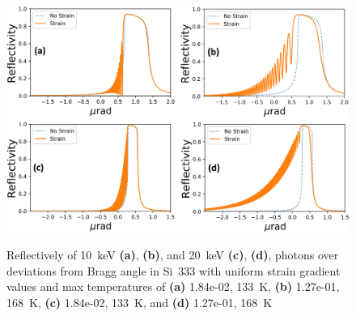 \documentclass[preprint]{iucr}              %
\begin{document}
\begin{figure}
\caption{Reflectively of 10~keV \textbf{(a)}, \textbf{(b)}, and 20~keV \textbf{(c)}, \textbf{(d)}, photons over deviations from Bragg angle in Si~333 with uniform strain gradient values and max temperatures of \textbf{(a)} 1.84e-02, 133~K, \textbf{(b)}  1.27e-01, 168~K, \textbf{(c)} 1.84e-02, 133~K, and \textbf{(d)}  1.27e-01, 168~K}
\includegraphics[width = \textwidth]{images/333USG.png}
\label{fig:333USG}
\end{figure}
\end{document}
